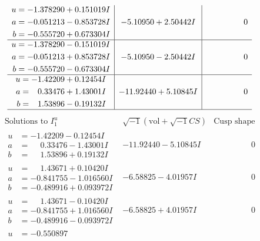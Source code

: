 \documentclass[1p]{elsarticle_modified}
\theoremstyle{definition}
\newcommand{\I}{\sqrt{-1}}
\begin{document}
$$\begin{array}{c|c|c}
\begin{aligned}
u &= -1.378290 + 0.151019 I \\
a &= -0.051213 - 0.853728 I \\
b &= -0.555720 + 0.673304 I\end{aligned}
 & -5.10950 + 2.50442 I & \phantom{-0.000000 } 0 \\ \hline\begin{aligned}
u &= -1.378290 - 0.151019 I \\
a &= -0.051213 + 0.853728 I \\
b &= -0.555720 - 0.673304 I\end{aligned}
 & -5.10950 - 2.50442 I & \phantom{-0.000000 } 0 \\ \hline\begin{aligned}
u &= -1.42209 + 0.12454 I \\
a &= \phantom{-}0.33476 + 1.43001 I \\
b &= \phantom{-}1.53896 - 0.19132 I\end{aligned}
 & -11.92440 + 5.10845 I & \phantom{-0.000000 } 0\\
 \hline 
 \end{array}$$\newpage$$\begin{array}{c|c|c}  
\text{Solutions to }I^u_{1}& \I (\text{vol} + \sqrt{-1}CS) & \text{Cusp shape}\\
 \hline 
\begin{aligned}
u &= -1.42209 - 0.12454 I \\
a &= \phantom{-}0.33476 - 1.43001 I \\
b &= \phantom{-}1.53896 + 0.19132 I\end{aligned}
 & -11.92440 - 5.10845 I & \phantom{-0.000000 } 0 \\ \hline\begin{aligned}
u &= \phantom{-}1.43671 + 0.10420 I \\
a &= -0.841755 - 1.016560 I \\
b &= -0.489916 + 0.093972 I\end{aligned}
 & -6.58825 - 4.01957 I & \phantom{-0.000000 } 0 \\ \hline\begin{aligned}
u &= \phantom{-}1.43671 - 0.10420 I \\
a &= -0.841755 + 1.016560 I \\
b &= -0.489916 - 0.093972 I\end{aligned}
 & -6.58825 + 4.01957 I & \phantom{-0.000000 } 0 \\ \hline\begin{aligned}
u &= -0.550897\phantom{ +0.000000I} \\

\end{aligned}
\end{array}$$
\end{document}
